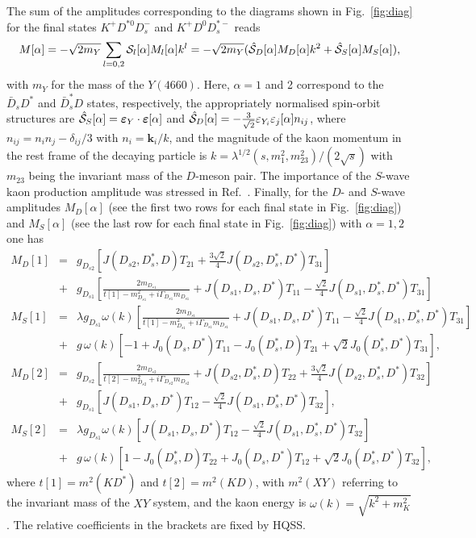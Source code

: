\documentclass[preprint,12pt,3p]{elsarticle}
\newcommand{\be}{\begin{equation}}
\newcommand{\ee}{\end{equation}}
\newcommand{\bea}{\begin{eqnarray}}
\newcommand{\eea}{\end{eqnarray}}
\def\vec#1{\boldsymbol{#1}}
\newcommand{\hSS}{\hat{{\cal S}}_S}
\newcommand{\hSD}{\hat{{\cal S}}_D}
\begin{document}
The sum of the amplitudes corresponding to the diagrams shown in Fig.~\ref{fig:diag} for the final states $K^+ D^{*0} {D}_s^{-}$ and $K^+ D^{0} {D}_s^{*-}$ reads
\be
M[\alpha]=-\sqrt{2m_Y}\sum_{l=0,2}{\cal S}_l[\alpha]M_l[\alpha] k^l=-\sqrt{2m_Y} (\hSD[\alpha]M_D[\alpha]k^2+\hSS[\alpha]M_S[\alpha]), 
\ee
with $m_Y$ for the mass of the $Y(4660)$.
Here, $\alpha=1$ and 2 correspond to the $\bar{D}_sD^*$ and
$\bar{D}_s^*D$ states, respectively, the appropriately normalised
spin-orbit structures are $\hSS[\alpha]=
\vec{\varepsilon}_{Y}\cdot\vec{\varepsilon}[\alpha]$ and
$\hSD[\alpha]=-\frac{3}{\sqrt{2}}
\varepsilon_{Y_i}\varepsilon_j[\alpha] n_{ij} $, where $n_{ij} = n_i
n_j-\delta_{ij}/3$ with $n_i=\vec{k}_i/k $, and the magnitude of the kaon
momentum in the rest frame of the decaying particle is $k =\lambda^{1/2}(s,m_1^2,m_{23}^2)/(2\sqrt{s})$ with $m_{23}$ being the invariant mass of the $D$-meson pair. 
The importance of the $S$-wave kaon production amplitude was stressed in Ref.~\cite{Du:2020vwb}. Finally, for the $D$- and $S$-wave amplitudes $M_D[\alpha]$ (see the first two rows for each final state in Fig.~\ref{fig:diag}) and $M_S[\alpha]$ (see the last row for each final state in Fig.~\ref{fig:diag}) with $\alpha=1,2$ one has 
\bea
M_D[1]&=&g_{D_{s2}}\left[J(D_{s2},D_s^*,D)T_{21}+\frac{3\sqrt2}{4}J(D_{s2},D_s^*,D^*)T_{31}\right]\label{eq:A1}\\
 &+&g_{D_{s1}}\left[\frac{2m_{D_{s1}}}{t[1]-m_{D_{s1}}^2+i\Gamma_{D_{s1}}m_{D_{s1}}}+J(D_{s1},D_s,D^*)T_{11}-\frac{\sqrt{2}}{4}J(D_{s1},D_s^*,D^*)T_{31}\right]\nonumber\\
M_S[1]&=&\lambda g_{D_{s1}} \omega(k)\left[\frac{2m_{D_{s1}}}{t[1]-m_{D_{s1}}^2+i\Gamma_{D_{s1}}m_{D_{s1}}}+J(D_{s1},D_s,D^*)T_{11}-\frac{\sqrt{2}} 
{4}J(D_{s1},D_s^*,D^*)T_{31}\right]\nonumber\\
 &+&g\,\omega(k) \left[-1+ J_0(D_s,D^*)T_{11}-J_0(D_s^*,D)T_{21}+\sqrt{2}J_0(D_s^*,D^*)T_{31}\right],\\ \label{eq:MD2}
M_D[2]&=&g_{D_{s2}}\left[\frac{2m_{D_{s2}}}{t[2]-m_{D_{s2}}^2+i\Gamma_{D_{s2}}m_{D_{s2}}}+J(D_{s2},D_s^*,D)T_{22}+\frac{3\sqrt2}{4} 
J(D_{s2},D_s^*,D^*)T_{32}\right]\nonumber\\
 &+&g_{D_{s1}}\left[J(D_{s1},D_s,D^*)T_{12}-\frac{\sqrt{2}}{4}J(D_{s1},D_s^*,D^*)T_{32}\right],\\
M_S[2]&=&\lambda g_{D_{s1}} \omega(k)\left[J(D_{s1},D_s,D^*)T_{12}-\frac{\sqrt{2}}{4}J(D_{s1},D_s^*,D^*)T_{32}\right]\label{eq:A2}\\
 &+&g\,\omega(k)\left[1-J_0(D_s^*,D)T_{22}+J_0(D_s,D^*)T_{12}+\sqrt{2}J_0(D_s^*,D^*)T_{32}\right],\nonumber
\eea
where $t[1]=m^2(KD^*)$ and $t[2]=m^2(KD)$, with $m^2(XY)$ referring to the invariant mass of the $XY$ system, and the kaon energy is $\omega(k)=\sqrt{k^2+m_K^2}$. The relative coefficients in the brackets are fixed by HQSS.
\end{document}
